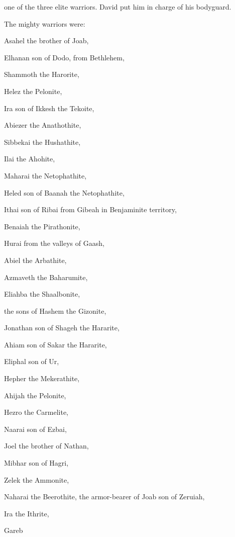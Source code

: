 {one of the three
elite warriors. David
put
him in charge of
his bodyguard.
\par }{\PP {}The mighty
warriors were:
\par }{\PP Asahel
the brother
of Joab,
\par }{\PP Elhanan
son
of Dodo,
from Bethlehem,
\par }{\PP {}Shammoth
the Harorite,
\par }{\PP Helez
the Pelonite,
\par }{\PP {}Ira
son
of Ikkesh
the Tekoite,
\par }{\PP Abiezer
the Anathothite,
\par }{\PP {}Sibbekai
the Hushathite,
\par }{\PP Ilai
the Ahohite,
\par }{\PP {}Maharai
the Netophathite,
\par }{\PP Heled
son
of Baanah
the Netophathite,
\par }{\PP {}Ithai
son
of Ribai
from Gibeah
in Benjaminite
territory,
\par }{\PP Benaiah
the Pirathonite,
\par }{\PP {}Hurai
from the valleys
of Gaash,
\par }{\PP Abiel
the Arbathite,
\par }{\PP {}Azmaveth
the Baharumite,
\par }{\PP Eliahba
the Shaalbonite,
\par }{\PP {}the sons
of Hashem
the Gizonite,
\par }{\PP Jonathan
son
of Shageh
the Hararite,
\par }{\PP {}Ahiam
son
of Sakar
the Hararite,
\par }{\PP Eliphal
son
of Ur,
\par }{\PP {}Hepher
the Mekerathite,
\par }{\PP Ahijah
the Pelonite,
\par }{\PP {}Hezro
the Carmelite,
\par }{\PP Naarai
son
of Ezbai,
\par }{\PP {}Joel
the brother
of Nathan,
\par }{\PP Mibhar
son
of Hagri,
\par }{\PP {}Zelek
the Ammonite,
\par }{\PP Naharai
the Beerothite,
the armor-bearer
of Joab
son
of Zeruiah,
\par }{\PP {}Ira
the Ithrite,
\par }{\PP Gareb
}
